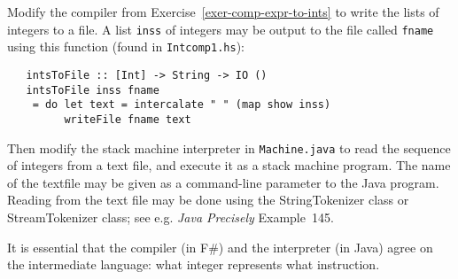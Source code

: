 \documentclass[a4paper]{article}
\begin{document}
\begin{exercise}\label{exer-read-ints-into-stack-machine}
  Modify the compiler from Exercise~\ref{exer-comp-expr-to-ints} to
  write the lists of integers to a file.  A list \texttt{inss} of
  integers may be output to the file called \texttt{fname} using this
  function (found in \texttt{Intcomp1.hs}):

{\codesetup\begin{verbatim}
   intsToFile :: [Int] -> String -> IO ()
   intsToFile inss fname 
    = do let text = intercalate " " (map show inss)
         writeFile fname text
\end{verbatim}}

\noindent
{\color{red}{This second part of the exercise requires the student to modify the file Machine.java, so I haven't translated this question.}} Then modify the stack machine interpreter in \texttt{Machine.java} to
read the sequence of integers from a text file, and execute it as a
stack machine program.  The name of the textfile may be given as a
command-line parameter to the Java program.  Reading from the text
file may be done using the StringTokenizer class or StreamTokenizer
class; see e.g. \emph{Java Precisely} Example~145.
  
It is essential that the compiler (in F\#) and the interpreter (in
Java) agree on the intermediate language: what integer represents what
instruction.
\end{exercise}
\end{document}
